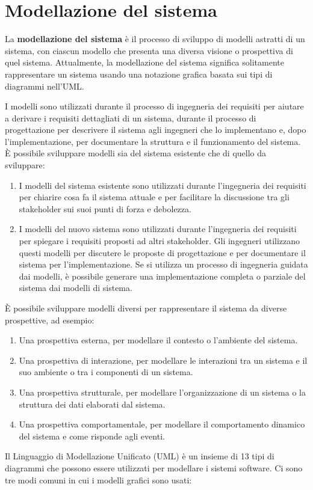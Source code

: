 \chapter{Modellazione del sistema}
\begin{redbar}
La \textbf{modellazione del sistema} è il processo di sviluppo di modelli astratti di un sistema, con ciascun modello che presenta una diversa visione o prospettiva di quel sistema. Attualmente, la modellazione del sistema significa solitamente rappresentare un sistema usando una notazione grafica basata sui tipi di diagrammi nell'UML.
\end{redbar}

I modelli sono utilizzati durante il processo di ingegneria dei requisiti per aiutare a derivare i requisiti dettagliati di un sistema, durante il processo di progettazione per descrivere il sistema agli ingegneri che lo implementano e, dopo l'implementazione, per documentare la struttura e il funzionamento del sistema. È possibile sviluppare modelli sia del sistema esistente che di quello da sviluppare:
\begin{enumerate}
    \item I modelli del sistema esistente sono utilizzati durante l'ingegneria dei requisiti per chiarire cosa fa il sistema attuale e per facilitare la discussione tra gli stakeholder sui suoi punti di forza e debolezza.
    \item I modelli del nuovo sistema sono utilizzati durante l'ingegneria dei requisiti per spiegare i requisiti proposti ad altri stakeholder. Gli ingegneri utilizzano questi modelli per discutere le proposte di progettazione e per documentare il sistema per l'implementazione. Se si utilizza un processo di ingegneria guidata dai modelli, è possibile generare una implementazione completa o parziale del sistema dai modelli di sistema.
\end{enumerate}
È possibile sviluppare modelli diversi per rappresentare il sistema da diverse prospettive, ad esempio:

\begin{enumerate}
    \item Una prospettiva esterna, per modellare il contesto o l'ambiente del sistema.
    \item Una prospettiva di interazione, per modellare le interazioni tra un sistema e il suo ambiente o tra i componenti di un sistema.
    \item Una prospettiva strutturale, per modellare l'organizzazione di un sistema o la struttura dei dati elaborati dal sistema.
    \item Una prospettiva comportamentale, per modellare il comportamento dinamico del sistema e come risponde agli eventi.
\end{enumerate}
Il Linguaggio di Modellazione Unificato (UML) è un insieme di 13 tipi di diagrammi che possono essere utilizzati per modellare i sistemi software.
Ci sono tre modi comuni in cui i modelli grafici sono usati:

